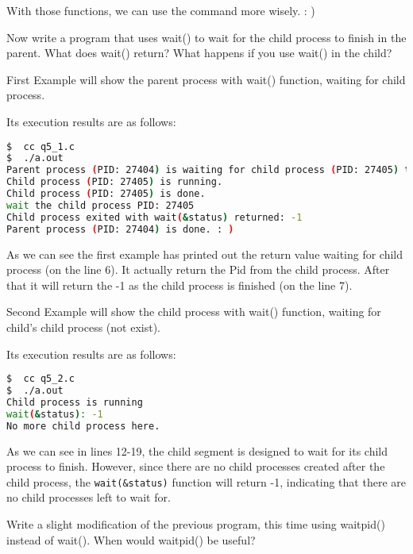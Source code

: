 \documentclass[10pt, answers]{exam}
\begin{document}
\begin{questions}
\begin{solution}
With those functions, we can use the command more wisely. : )

\end{solution}

\question
Now write a program that uses wait() to wait for the child process to finish in the parent. What does wait() return? What happens if you use wait() in the child?
\begin{solution}

First Example will show the parent process with wait() function, waiting for child process.



Its execution results are as follows:

\begin{lstlisting}[language=bash]
$  cc q5_1.c
$  ./a.out  
Parent process (PID: 27404) is waiting for child process (PID: 27405) to finish.
Child process (PID: 27405) is running.
Child process (PID: 27405) is done.
wait the child process PID: 27405
Child process exited with wait(&status) returned: -1
Parent process (PID: 27404) is done. : )
\end{lstlisting}
As we can see the first example has printed out the return value waiting for child process (on the line 6). It actually return the Pid from the child process. After that it will return the -1 as the child process is finished (on the line 7).

Second Example will show the child process with wait() function, waiting for child's child process (not exist).


Its execution results are as follows:

\begin{lstlisting}[language=bash]
$  cc q5_2.c
$  ./a.out  
Child process is running
wait(&status): -1
No more child process here.
\end{lstlisting}

As we can see in lines 12-19, the child segment is designed to wait for its child process to finish. However, since there are no child processes created after the child process, the \texttt{wait(\&status)} function will return -1, indicating that there are no child processes left to wait for.

\end{solution}

\question
Write a slight modification of the previous program, this time using waitpid() instead of wait(). When would waitpid() be useful?


\end{questions}
\end{document}
